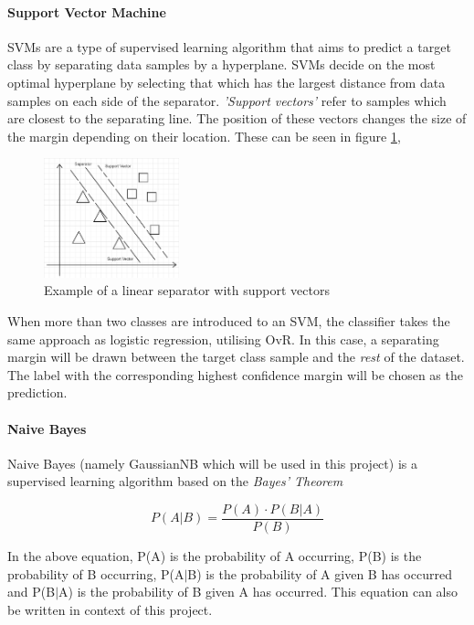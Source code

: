 \documentclass[conference]{IEEEtran}
\begin{document}
\paragraph{\textbf{Support Vector Machine}} SVMs are a type of supervised learning algorithm that aims to predict a target class by separating data samples by a hyperplane. SVMs decide on the most optimal hyperplane by selecting that which has the largest distance from data samples on each side of the separator. \textit{'Support vectors'} refer to samples which are closest to the separating line. The position of these vectors changes the size of the margin depending on their location. These can be seen in figure \ref{fig:support_vectors},

\begin{figure}[h]
    \centering
    \includegraphics[width=0.35\textwidth]{Support_vectors.png}
    \caption{Example of a linear separator with support vectors}
    \label{fig:support_vectors}
\end{figure}

When more than two classes are introduced to an SVM, the classifier takes the same approach as logistic regression, utilising OvR. In this case, a separating margin will be drawn between the target class sample and the \textit{rest} of the dataset. The label with the corresponding highest confidence margin will be chosen as the prediction.\\

\paragraph{\textbf{Naive Bayes}}
Naive Bayes (namely GaussianNB which will be used in this project) is a supervised learning algorithm based on the \textit{Bayes' Theorem}

\[P(A|B) = \frac{P(A) \cdot P(B|A)}{P(B)}\]

In the above equation, P(A) is the probability of A occurring, P(B) is the probability of B occurring, P(A$|$B) is the probability of A given B has occurred and P(B$|$A) is the probability of B given A has occurred. This equation can also be written in context of this project.
\end{document}
